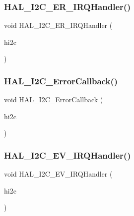 \subsubsection{\texorpdfstring{H\+A\+L\+\_\+\+I2\+C\+\_\+\+E\+R\+\_\+\+I\+R\+Q\+Handler()}{HAL\_I2C\_ER\_IRQHandler()}}
{\footnotesize\ttfamily void H\+A\+L\+\_\+\+I2\+C\+\_\+\+E\+R\+\_\+\+I\+R\+Q\+Handler (\begin{DoxyParamCaption}\item[{\hyperlink{group___i2_c__handle___structure__definition_ga68e9f45c2fd2161fb827ccdeabb55ea5}{I2\+C\+\_\+\+Handle\+Type\+Def} $\ast$}]{hi2c }\end{DoxyParamCaption})}

\mbox{\label{group___i2_c___i_r_q___handler__and___callbacks_ga4d5338cd64a656dfdc4154773bc4f05d}} 
\subsubsection{\texorpdfstring{H\+A\+L\+\_\+\+I2\+C\+\_\+\+Error\+Callback()}{HAL\_I2C\_ErrorCallback()}}
{\footnotesize\ttfamily void H\+A\+L\+\_\+\+I2\+C\+\_\+\+Error\+Callback (\begin{DoxyParamCaption}\item[{\hyperlink{group___i2_c__handle___structure__definition_ga68e9f45c2fd2161fb827ccdeabb55ea5}{I2\+C\+\_\+\+Handle\+Type\+Def} $\ast$}]{hi2c }\end{DoxyParamCaption})}

\mbox{\label{group___i2_c___i_r_q___handler__and___callbacks_ga0cd3cc56c83b85a65e31c945c854d9d5}} 
\subsubsection{\texorpdfstring{H\+A\+L\+\_\+\+I2\+C\+\_\+\+E\+V\+\_\+\+I\+R\+Q\+Handler()}{HAL\_I2C\_EV\_IRQHandler()}}
{\footnotesize\ttfamily void H\+A\+L\+\_\+\+I2\+C\+\_\+\+E\+V\+\_\+\+I\+R\+Q\+Handler (\begin{DoxyParamCaption}\item[{\hyperlink{group___i2_c__handle___structure__definition_ga68e9f45c2fd2161fb827ccdeabb55ea5}{I2\+C\+\_\+\+Handle\+Type\+Def} $\ast$}]{hi2c }\end{DoxyParamCaption})}

